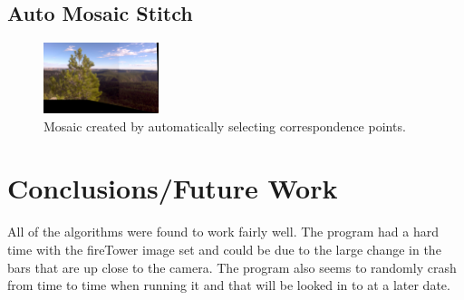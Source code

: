 \documentclass[10pt,twocolumn,letterpaper]{article}
\begin{document}
  \subsection{Auto Mosaic Stitch}

    \begin{figure}[ht!]
    \centering
    \includegraphics[width=0.3\textwidth]{img/auto_mos_buzzard.eps}
    \caption{Mosaic created by automatically selecting correspondence points.}
    \label{fig:auto_mosaic_res}
    \end{figure}
    
\section{Conclusions/Future Work}
All of the algorithms were found to work fairly well. The program had a hard time with the fireTower image set and could be due to the large change in the bars that are up close to the camera. The program also seems to randomly crash from time to time when running it and that will be looked in to at a later date.

{\small


}
\end{document}

